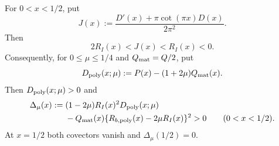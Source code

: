 \begin{proposition}
\label{JC:prop:regular-completed-covector-ratio}
For $0<x<1/2$, put
\[
 J(x):=\frac{D'(x)+\pi\cot(\pi x)D(x)}{2\pi^2}.
\]
Then
\begin{equation}\label{JC:eq:regular-completed-covector-ratio}
 \boxed{2R_I(x)<J(x)<R_I(x)<0.}
\end{equation}
Consequently, for $0\le\mu\le1/4$ and
$Q_{\rm mat}=Q/2$,
put
\[
 D_{\rm poly}(x;\mu)
 :=P(x)-(1+2\mu)Q_{\rm mat}(x).
\]
Then $D_{\rm poly}(x;\mu)>0$ and
\begin{equation}\label{JC:eq:regular-completed-covector-determinant}
 \begin{aligned}
 \Delta_\mu(x):={}&(1-2\mu)R_I(x)^2
 D_{\rm poly}(x;\mu)\\
 &-Q_{\rm mat}(x)
 \{R_{b,{\rm poly}}(x)-2\mu R_I(x)\}^2>0
 \qquad(0<x<1/2).
 \end{aligned}
\end{equation}
At $x=1/2$ both covectors vanish and $\Delta_\mu(1/2)=0$.
\end{proposition}

